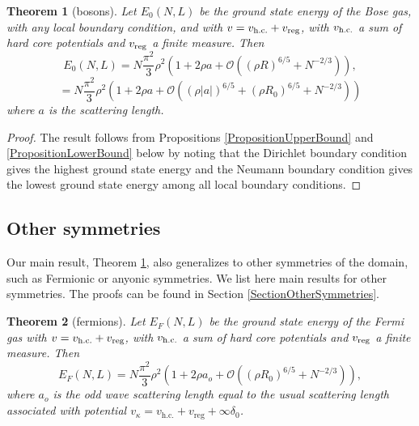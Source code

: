 \documentclass[a4paper,11pt]{article}
\newtheorem{theorem}{Theorem}
\numberwithin{equation}{section}
\begin{document}
\begin{theorem}[bosons]
\label{TheoremMain}
Let $E_0(N,L) $ be the ground state energy of the Bose gas, with any local boundary condition, and with $ v=v_{\textnormal{h.c.}}+v_{\textnormal{reg}} $, with $ v_{\textnormal{h.c.}} $ a sum of hard core potentials and $ v_{\textnormal{reg}} $ a finite measure. Then 
\begin{equation}
E_0(N,L)=N\frac{\pi^2}{3}\rho^2\left(1+2\rho a+\mathcal{O}\left(\left(\rho R\right)^{6/5}+N^{-2/3}\right)\right),
\end{equation}
$$
=N\frac{\pi^2}{3}\rho^2\left(1+2\rho a+
\mathcal{O}
\left((\rho|a|)^{6/5}+(\rho R_0)^{6/5}+N^{-2/3}\right)\right)
$$
where $ a $ is the scattering length.
\end{theorem}
\begin{proof}
	The result follows from Propositions \ref{PropositionUpperBound} and \ref{PropositionLowerBound} below by noting that the Dirichlet boundary condition gives the highest ground state energy and the Neumann boundary condition gives the lowest ground state energy among all local boundary conditions.
\end{proof}




\subsection{Other symmetries}
Our main result, Theorem \ref{TheoremMain}, also generalizes to other symmetries of the domain, such as Fermionic or anyonic symmetries. We list here main results for other symmetries. The proofs can be found in Section \ref{SectionOtherSymmetries}.
\begin{theorem}[fermions]\label{TheoremMainFermion}
Let $ E_F(N,L) $ be the ground state energy of the Fermi gas with $ v=v_{\textnormal{h.c.}}+v_{\textnormal{reg}} $, with $ v_{\textnormal{h.c.}} $ a sum of hard core potentials and $ v_{\textnormal{reg}} $ a finite measure. Then \begin{equation}
E_F(N,L)=N\frac{\pi^2}{3}\rho^2\left(1+2\rho a_o+\mathcal{O}\left(\left(\rho R_0\right)^{6/5}+N^{-2/3}\right)\right),
\end{equation}
where $ a_o $ is the odd wave scattering length equal to the usual scattering length associated with potential $ v_\kappa=v_{\text{h.c.}}+v_{\text{reg}}+\infty\delta_0 $.
\end{theorem}
\end{document}
